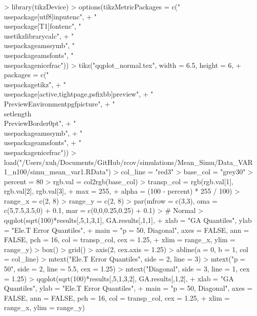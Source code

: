 \documentclass{article}
\begin{document}


\begin{Schunk}
\begin{Sinput}
> library(tikzDevice)
> options(tikzMetricPackages = c("\\usepackage[utf8]{inputenc}",
+     "\\usepackage[T1]{fontenc}", "\\usetikzlibrary{calc}",
+     "\\usepackage{amssymb}", "\\usepackage{amsfonts}", "\\usepackage{nicefrac}"))
> tikz("qqplot_normal.tex", width = 6.5, height = 6,
+      packages = c("\\usepackage{tikz}",
+                  "\\usepackage[active,tightpage,psfixbb]{preview}",
+                  "\\PreviewEnvironment{pgfpicture}",
+                  "\\setlength\\PreviewBorder{0pt}",
+                  "\\usepackage{amssymb}",
+                  "\\usepackage{amsfonts}",
+                  "\\usepackage{nicefrac}"))
> load("/Users/xuh/Documents/GitHub/rcov/simulations/Mean_Simu/Data_VAR1_n100/simu_mean_var1.RData")
> col_line = "red3"
> base_col = "grey30"
> percent = 80
> rgb.val = col2rgb(base_col)
> transp_col = rgb(rgb.val[1], rgb.val[2], rgb.val[3],
+              max = 255,
+              alpha = (100 - percent) * 255 / 100)
> range_x = c(2, 8)
> range_y = c(2, 8)
> par(mfrow = c(3,3), oma = c(5,7.5,3.5,0) + 0.1, mar = c(0,0,0.25,0.25) + 0.1)
> # Normal
> qqplot(sqrt(100)*results[,5,1,3,1], GA.results[,1,1],
+        xlab = "GA Quantiles", ylab = "Ele.T Error Quantiles",
+        main = "p = 50, Diagonal", axes = FALSE, ann = FALSE, pch = 16, col = transp_col, cex = 1.25,
+        xlim = range_x, ylim = range_y)
> box()
> grid()
> axis(2, cex.axis = 1.25)
> abline(a = 0, b = 1, col = col_line)
> mtext("Ele.T Error Quantiles", side = 2, line = 3)
> mtext("p = 50", side = 2, line = 5.5, cex = 1.25)
> mtext("Diagonal", side = 3, line = 1, cex = 1.25)
> qqplot(sqrt(100)*results[,5,1,3,2], GA.results[,1,2],
+        xlab = "GA Quantiles", ylab = "Ele.T Error Quantiles",
+        main = "p = 50, Diagonal", axes = FALSE, ann = FALSE, pch = 16, col = transp_col, cex = 1.25,
+        xlim = range_x, ylim = range_y)

\end{Sinput}
\end{Schunk}
\end{document}
